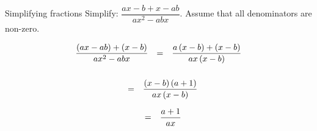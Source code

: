 
\begin{wex}{ Simplifying fractions }{Simplify: $\dfrac{ax-b+x-ab}{a{x}^{2}-abx}$. Assume that all denominators are non-zero.}{


\par 


\begin{equation*}
\begin{array}{lll}\dfrac{\left(ax-ab\right)+\left(x-b\right)}{a{x}^{2}-abx}\hfill & =& \dfrac{a\left(x-b\right)+\left(x-b\right)}{ax\left(x-b\right)}\hfill \\ \end{array}
\end{equation*}
\begin{equation*}
\begin{array}{lll}
\\& =& \dfrac{\left(x-b\right)\left(a+1\right)}{ax\left(x-b\right)}\hfill \end{array}
\end{equation*}

\begin{equation*}
\begin{array}{ccc}& =& \dfrac{a+1}{ax}\hfill \end{array}
\end{equation*}
}
\end{wex}


